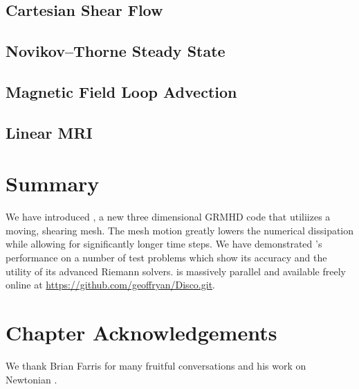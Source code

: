 \subsection{Cartesian Shear Flow}
\subsection{Novikov--Thorne Steady State}
\subsection{Magnetic Field Loop Advection}
\subsection{Linear MRI}


\section{Summary}

We have introduced \grdisco, a new three dimensional GRMHD code that utiliizes a moving, shearing mesh.  The mesh motion greatly lowers the numerical dissipation while allowing for significantly longer time steps.  We have demonstrated \grdisco's performance on a number of test problems which show its accuracy and the utility of its advanced Riemann solvers.  \grdisco is massively parallel and available freely online at \url{https://github.com/geoffryan/Disco.git}.

\section{Chapter Acknowledgements} 

We thank Brian Farris for many fruitful conversations and his work on Newtonian \disco.  

